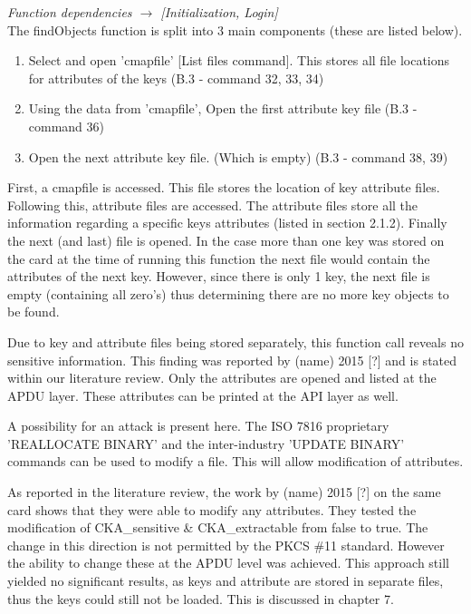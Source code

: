 \documentclass[bsc,frontabs,twoside,singlespacing,parskip,deptreport]{infthesis}     %
\begin{document}
\textit{Function dependencies $\rightarrow$ [Initialization, Login]}\\


The findObjects function is split into 3 main components (these are listed below).

\begin{enumerate}
\item Select and open 'cmapfile' [List files command]. This stores all file locations for attributes of the keys (B.3 - command 32, 33, 34)
\item Using the data from 'cmapfile', Open the first attribute key file (B.3 - command 36)
\item Open the next attribute key file. (Which is empty) (B.3 - command 38, 39)\\
\end{enumerate}


First, a cmapfile is accessed. This file stores the location of key attribute files. Following this, attribute files are accessed. The attribute files store all the information regarding a specific keys attributes (listed in section 2.1.2). Finally the next (and last) file is opened. In the case more than one key was stored on the card at the time of running this function the next file would contain the attributes of the next key. However, since there is only 1 key, the next file is empty (containing all zero's) thus determining there are no more key objects to be found.

Due to key and attribute files being stored separately, this function call reveals no sensitive information. This finding was reported by (name) 2015 [?] and is stated within our literature review. Only the attributes are opened and listed at the APDU layer. These attributes can be printed at the API layer as well.

A possibility for an attack is present here. The ISO 7816 proprietary 'REALLOCATE BINARY' and the inter-industry 'UPDATE BINARY' commands can be used to modify a file. This will allow modification of attributes. 

As reported in the literature review, the work by (name) 2015 [?] on the same card shows that they were able to modify any attributes. They tested the modification of CKA\_sensitive \& CKA\_extractable from false to true. The change in this direction is not permitted by the PKCS \#11 standard. However the ability to change these at the APDU level was achieved. This approach still yielded no significant results, as keys and attribute are stored in separate files, thus the keys could still not be loaded. This is discussed in chapter 7.
\end{document}
